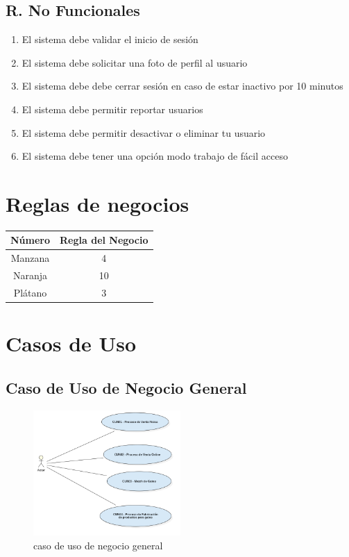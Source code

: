 \documentclass{article}
\begin{document}
\subsection{R. No Funcionales}
\begin{enumerate}
    \item El sistema debe validar el inicio de sesión
    \item El sistema debe solicitar una foto de perfil al usuario
    \item El sistema debe debe cerrar sesión en caso de estar inactivo por 10 minutos
    \item El sistema debe permitir reportar usuarios
    \item El sistema debe permitir desactivar o eliminar tu usuario
    \item El sistema debe tener una opción modo trabajo de fácil acceso
\end{enumerate}
\clearpage
\section{Reglas de negocios}
\begin{tabular}{| c | c |}
    \hline
    Número & Regla del Negocio \\ \hline
    Manzana & 4 \\
    Naranja & 10 \\
    Plátano & 3 \\ \hline
    \end{tabular}
\clearpage
\section{Casos de Uso}
\subsection{Caso de Uso de Negocio General}
\begin{figure}[h]
    \begin{center}
        \includegraphics[width=0.5\textwidth]{images/Caso de uso general v2.png}
        \caption{caso de uso de negocio general}
    \end{center}
\end{figure}
\end{document}
